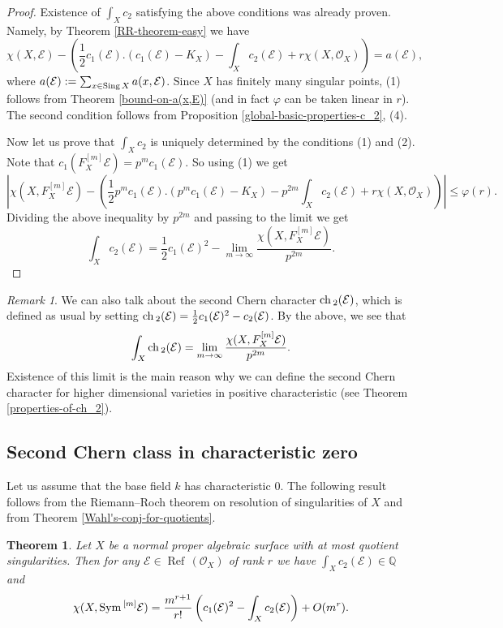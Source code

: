 \documentclass[twoside, 11pt]{article}
\theoremstyle{plain}
\newtheorem{Theorem}[Thm]{\sc Theorem}
\theoremstyle{definition}
\theoremstyle{remark}
\newtheorem{Remark}[Thm]{Remark}
\newcommand{\QQ}{{\mathbb Q}}
\newcommand{\cE}{{\mathcal E}}
\newcommand{\cO}{{\mathcal O}}
\newcommand{\Refl}{{\mathop{\operatorname{Ref}\, }}}
\newcommand{\ch}{{\mathop{\rm ch \, }}}
\newcommand{\Sym}{{\mathop{{\rm Sym \, }}}}
\newcommand{\Sing}{{\mathop{{\rm Sing \,}}}}
\begin{document}
\begin{proof}
Existence of $\int _Xc_2$ satisfying the above conditions was already proven. Namely, by Theorem \ref{RR-theorem-easy} we have
$$\chi (X, \cE) -\left(\frac {1}{2}c_1 (\cE). (c_1(\cE) -K_X)- \int_Xc_2 (\cE) +r\chi (X, \cO_X)\right) =a(\cE),$$
where $a(\cE):=\sum _{x\in \Sing X} a(x, \cE)$. Since $X$ has finitely many singular points,
(1) follows from Theorem \ref{bound-on-a(x,E)} (and in fact $\varphi$ can be taken linear in $r$).  The second condition follows from Proposition \ref{global-basic-properties-c_2}, (4).

Now let us prove that $\int _Xc_2$ is uniquely determined by the conditions (1) and (2).
Note that $c_1(F_X^{[m]} \cE) =p^m c_1(\cE)$. So  using (1) we get
\begin{equation*}
\left | \chi (X, F_X^{[m]} \cE) - \left(\frac {1}{2}p^mc_1 (\cE). (p^mc_1(\cE) -K_X)- p^{2m} \int_Xc_2 (\cE) +r \chi (X, \cO_X)\right)
\right| \le \varphi(r).
\end{equation*}
Dividing the above inequality by $p^{2m}$ and passing to the limit we get
$$\int_Xc_2 (\cE) = \frac{1}{2} c_1(\cE)^2- \lim _{m\to \infty} \frac{\chi (X, F_X^{[m]} \cE) }{p^{2m}}.$$
\end{proof}

\medskip

\begin{Remark}\label{ch_2-on-surfaces}
We can also talk about the second  Chern character $ \ch _2 (\cE)$, which is defined as usual by setting $\ch _2 (\cE)= \frac{1}{2} c_1(\cE)^2- c_2 (\cE)$. By the above, we see that 
$$\int_X \ch _2 (\cE)=\lim _{m\to \infty} \frac{\chi (X, F_X^{[m]} \cE) }{p^{2m}}.$$
Existence of this limit is the main reason why we can define the second  Chern character for higher dimensional varieties in positive characteristic (see Theorem \ref{properties-of-ch_2}).
\end{Remark}


\subsection{Second Chern class in characteristic zero}

Let us assume that the base field $k$ has characteristic $0$. 
The following result follows from the Riemann--Roch theorem on resolution of singularities of $X$ and from Theorem \ref{Wahl's-conj-for-quotients}.

\begin{Theorem}\label{asymptotic-RR-quotient-surfaces}
Let $X$ be a normal proper algebraic surface with at most quotient singularities. Then for any
$\cE\in \Refl(\cO_X)$  of rank $r$ we have  $\int_X c_2(\cE) \in \QQ$ and
$$\chi (X, \Sym ^{[m]}\cE)=\frac{m^{r+1}}{r!} \left(c_1(\cE)^2-\int_X c_2(\cE) \right) + O(m^r). $$
\end{Theorem}
\end{document}
